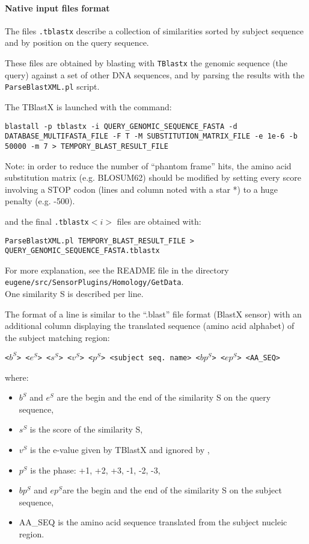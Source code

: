 \paragraph{Native input files format}

The files \texttt{.tblastx} describe a collection of similarities
sorted by subject sequence and by position on the query sequence.

These files are obtained by blasting with \texttt{TBlastx} the genomic
sequence (the query) against a set of other DNA sequences, and by
parsing the results with the \texttt{ParseBlastXML.pl} script.

The TBlastX is launched with the command:

\begin{Verbatim}[fontsize=\small]
blastall -p tblastx -i QUERY_GENOMIC_SEQUENCE_FASTA -d
DATABASE_MULTIFASTA_FILE -F T -M SUBSTITUTION_MATRIX_FILE -e 1e-6 -b
50000 -m 7 > TEMPORY_BLAST_RESULT_FILE
\end{Verbatim}

Note: in order to reduce the number of ``phantom frame'' hits, the
amino acid substitution matrix (e.g. BLOSUM62) should be modified by
setting every score involving a STOP codon (lines and column noted
with a star *) to a huge penalty (e.g. -500).

and the final \texttt{.tblastx}$<i>$ files are obtained with:
\begin{Verbatim}[fontsize=\small]
ParseBlastXML.pl TEMPORY_BLAST_RESULT_FILE > QUERY_GENOMIC_SEQUENCE_FASTA.tblastx
\end{Verbatim}

For more explanation, see the README file in the directory\\
\texttt{eugene/src/SensorPlugins/Homology/GetData}.\\

One similarity S is described per line.

The format of a line is similar to the ``.blast'' file format (BlastX
sensor) with an additional column displaying the translated sequence
(amino acid alphabet) of the subject matching region:

\texttt{<$b^S$> <$e^S$> <$s^S$> <$v^S$> <$p^S$> <subject seq. name> <$bp^S$> <$ep^S$> <AA\_SEQ>}

where:
\begin{itemize}
\item $b^S$ and $e^S$ are the begin and the end of the similarity S on the query sequence,
\item $s^S$ is the score of the similarity S,
\item $v^S$ is the e-value given by TBlastX and ignored by \EuGene,
\item $p^S$ is the phase: +1, +2, +3, -1, -2, -3,
\item $bp^S$ and $ep^S$are the begin and the end of the similarity S on the subject sequence,
\item AA\_SEQ is the amino acid sequence translated from the subject nucleic region.
\end{itemize}

